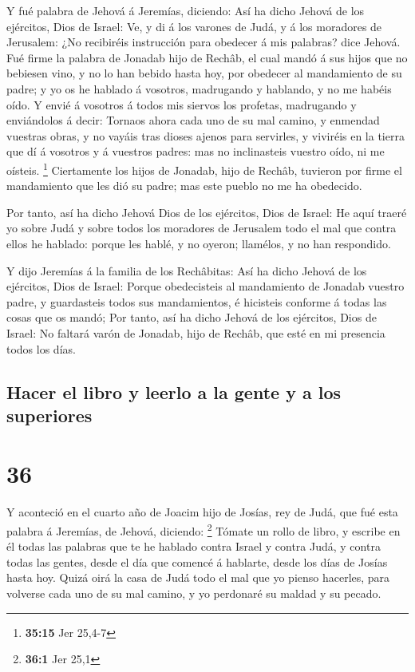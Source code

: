  Y fué palabra de Jehová á Jeremías, diciendo:
 Así ha dicho Jehová de los ejércitos, Dios de Israel: Ve,
y di á los varones de Judá, y á los moradores de Jerusalem: ¿No
recibiréis instrucción para obedecer á mis palabras? dice Jehová.
 Fué firme la palabra de Jonadab hijo de Rechâb, el cual
mandó á sus hijos que no bebiesen vino, y no lo han bebido hasta hoy,
por obedecer al mandamiento de su padre; y yo os he hablado á vosotros,
madrugando y hablando, y no me habéis oído.  Y envié á
vosotros á todos mis siervos los profetas, madrugando y enviándolos á
decir: Tornaos ahora cada uno de su mal camino, y enmendad vuestras
obras, y no vayáis tras dioses ajenos para servirles, y viviréis en la
tierra que dí á vosotros y á vuestros padres: mas no inclinasteis
vuestro oído, ni me oísteis. \footnote{\textbf{35:15} Jer 25,4-7}
 Ciertamente los hijos de Jonadab, hijo de Rechâb, tuvieron
por firme el mandamiento que les dió su padre; mas este pueblo no me ha
obedecido.

 Por tanto, así ha dicho Jehová Dios de los ejércitos, Dios
de Israel: He aquí traeré yo sobre Judá y sobre todos los moradores de
Jerusalem todo el mal que contra ellos he hablado: porque les hablé, y
no oyeron; llamélos, y no han respondido.

 Y dijo Jeremías á la familia de los Rechâbitas: Así ha
dicho Jehová de los ejércitos, Dios de Israel: Porque obedecisteis al
mandamiento de Jonadab vuestro padre, y guardasteis todos sus
mandamientos, é hicisteis conforme á todas las cosas que os mandó;
 Por tanto, así ha dicho Jehová de los ejércitos, Dios de
Israel: No faltará varón de Jonadab, hijo de Rechâb, que esté en mi
presencia todos los días.

\hypertarget{hacer-el-libro-y-leerlo-a-la-gente-y-a-los-superiores}{%
\subsection{Hacer el libro y leerlo a la gente y a los
superiores}\label{hacer-el-libro-y-leerlo-a-la-gente-y-a-los-superiores}}

\hypertarget{section-35}{%
\section{36}\label{section-35}}

 Y aconteció en el cuarto año de Joacim hijo de Josías, rey
de Judá, que fué esta palabra á Jeremías, de Jehová, diciendo:
\footnote{\textbf{36:1} Jer 25,1}  Tómate un rollo de libro,
y escribe en él todas las palabras que te he hablado contra Israel y
contra Judá, y contra todas las gentes, desde el día que comencé á
hablarte, desde los días de Josías hasta hoy.  Quizá oirá la
casa de Judá todo el mal que yo pienso hacerles, para volverse cada uno
de su mal camino, y yo perdonaré su maldad y su pecado.

